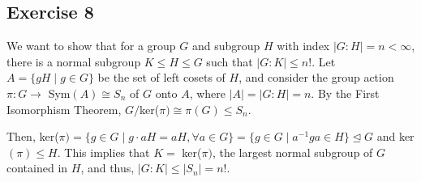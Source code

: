 \subsection*{Exercise 8}
We want to show that for a group $G$ and subgroup $H$ with index $|G:H| = n < \infty$, there is a normal subgroup $K \le H \le G$ such that $|G: K| \le n!$. Let $A = \{gH \mid g \in G\}$ be the set of left cosets of $H$, and consider the group action $\pi: G \rightarrow$ Sym$(A) \cong S_n$ of $G$ onto $A$, where $|A| = |G:H| = n$. By the First Isomorphism Theorem, $G/$ker($\pi) \cong \pi(G) \le S_n$.

Then, ker($\pi) = \{g \in G \mid g\cdot aH = aH, \forall a \in G\} = \{g \in G \mid a^{-1}ga \in H \} \trianglelefteq G$ and ker$(\pi) \le H$. This implies that $K =$ ker($\pi)$, the largest normal subgroup of $G$ contained in $H$, and thus, $|G:K| \le |S_n| = n!$.